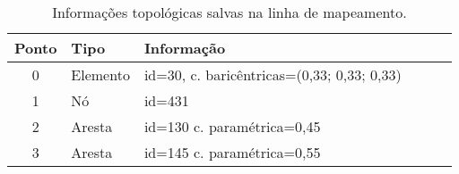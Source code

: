 
\begin{table} [h]
 \begin{center}
	 \caption{Informações topológicas salvas na linha de mapeamento.\label{tab-lm-topo}}
	~\\[-2mm]
	 \begin{tabularx}
		 {\textwidth}
		 {cp{2.0cm} lp{3.0cm} lp{10.0cm}}

		 \textbf{Ponto}
		 & \textbf{Tipo}
		 & \textbf{Informação} \\ \toprule

		 0
		 & Elemento
		 & id=30, c. baricêntricas=(0,33; 0,33; 0,33) \\ \midrule

		 1
		 & Nó   
		 & id=431 \\ \midrule

		 2
		 & Aresta
		 & id=130 c. paramétrica=0,45 \\ \midrule

		 3
		 & Aresta
		 & id=145 c. paramétrica=0,55 \\ \midrule

	 \end{tabularx}
 \end{center}
\end{table}
